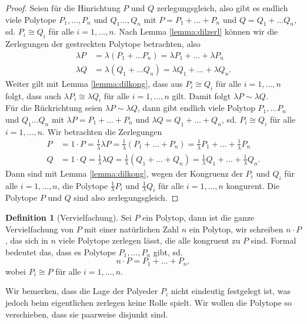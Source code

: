 \documentclass[11pt,titlepage]{article}
\theoremstyle{definition}
\newtheorem{definition}[theorem]{Definition}
\theoremstyle{remark}
\begin{document}
	\begin{proof}
		Seien für die Hinrichtung $P$ und $Q$ zerlegungsgleich, also gibt 
		es endlich viele Polytope $P_1,\ldots,P_n$ und $Q_1\ldots,Q_n$ mit 
		$P=P_1+\ldots+P_n$ und $Q=Q_1+\ldots Q_n$, sd. $P_i\cong Q_i$ 
		für alle $i=1,\ldots, n$. Nach Lemma \ref{lemma:dilzerl} können wir 
		die Zerlegungen der gestreckten Polytope betrachten, also
		\begin{align*}
			\lambda P&=\lambda (P_1+\ldots P_n)=\lambda P_1 +\ldots+\lambda P_n \\
			\lambda Q&=\lambda (Q_1+\ldots Q_n)=\lambda Q_1 +\ldots+\lambda Q_n.
		\end{align*}
		Weiter gilt mit Lemma \ref{lemma:dilkong}, dass aus $P_i\cong Q_i$ 
		für alle $i=1,\ldots,n$ folgt, dass auch $\lambda P_i\cong\lambda Q_i$ 
		für alle $i=1,\ldots,n$ gilt. Damit folgt $\lambda P\sim \lambda Q$. \\
		Für die Rückrichtung seien $\lambda P\sim \lambda Q$, dann gibt 
		endlich viele Polytop $P_1,\ldots P_n$ und $Q_1\ldots Q_n$ mit 
		$\lambda P=P_1+\ldots+P_n$ und $\lambda Q=Q_1+\ldots+Q_n$, sd. 
		$P_i\cong Q_i$ für alle $i=1,\ldots,n$. Wir betrachten die 
		Zerlegungen
		\begin{align*}
			P&=1\cdot P=\frac{1}{\lambda}\lambda P=\frac{1}{\lambda}(P_1+\ldots+P_n)
			=\frac{1}{\lambda}P_1+\ldots+\frac{1}{\lambda}P_n \\
			Q&=1\cdot Q=\frac{1}{\lambda}\lambda Q=\frac{1}{\lambda}(Q_1+\ldots+Q_n)
			=\frac{1}{\lambda}Q_1+\ldots+\frac{1}{\lambda}Q_n.
		\end{align*}
		Dann sind mit Lemma \ref{lemma:dilkong}, wegen der Kongruenz der $P_i$ und 
		$Q_i$ für alle $i=1,\ldots,n$, die Polytope $\frac{1}{\lambda}P_i$ und 
		$\frac{1}{\lambda}Q_i$ für alle $i=1,\ldots,n$ kongurent. 
		Die Polytope $P$ und $Q$ sind also zerlegungsgleich.
	\end{proof}
	
	\begin{definition}[Vervielfachung]
		Sei $P$ ein Polytop, dann ist die ganze Vervielfachung von $P$ mit 
		einer natürlichen Zahl $n$ ein Polytop, wir schreiben $n\cdot P$, 
		das sich in $n$ viele Polytope zerlegen lässt, die alle kongruent zu 
		$P$ sind. Formal bedeutet das, dass es Polytope $P_1,\ldots,P_n$ gibt, sd.
		\[n\cdot P=P_1+\ldots+P_n,\]
		wobei $P_i\cong P$ für alle $i=1,\ldots,n$.
	\end{definition}
	
	Wir bemerken, dass die Lage der Polyeder $P_i$ nicht eindeutig festgelegt 
	ist, was jedoch beim eigentlichen zerlegen keine Rolle spielt. Wir wollen 
	die Polytope so verschieben, dass sie paarweise disjunkt sind.
	
\end{document}
